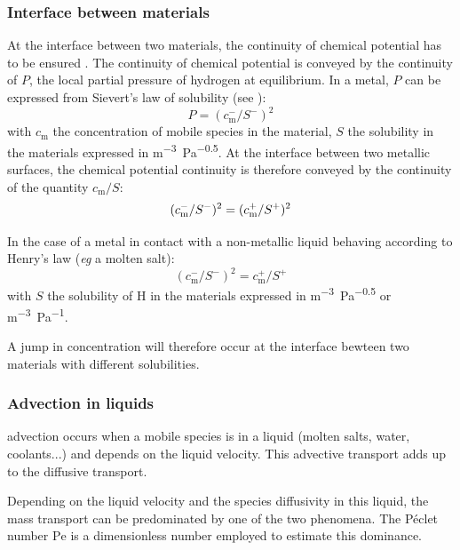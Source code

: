 \subsubsection{Interface between materials}
At the interface between two materials, the continuity of chemical potential has to be ensured .
The continuity of chemical potential is conveyed by the continuity of $P$, the local partial pressure of hydrogen at equilibrium.
In a metal, $P$ can be expressed from Sievert's law of solubility (see ):
\begin{equation}
    P = (c_\mathrm{m}^-/S^-)^2
\end{equation}
with $c_\mathrm{m}$ the concentration of mobile species in the material, $S$ the solubility in the materials expressed in \si{m^{-3}.Pa^{-0.5}}.
At the interface between two metallic surfaces, the chemical potential continuity is therefore conveyed by the continuity of the quantity $c_\mathrm{m}/S$:
\begin{equation}
    (c_\mathrm{m}^-/S^-)^2 = (c_\mathrm{m}^+/S^+)^2
    \labeq{c/s conservation}
\end{equation}

In the case of a metal in contact with a non-metallic liquid behaving according to Henry's law (\textit{eg} a molten salt):
\begin{equation}
    (c_\mathrm{m}^-/S^-)^2 = c_\mathrm{m}^+/S^+
\end{equation}
with $S$ the solubility of \gls{H} in the materials expressed in \si{m^{-3}.Pa^{-0.5}} or \si{m^{-3}.Pa^{-1}}.

A jump in concentration will therefore occur at the interface bewteen two materials with different solubilities.

\subsubsection{Advection in liquids}
\Gls{advection} occurs when a mobile species is in a liquid (molten salts, water, coolants...) and depends on the liquid velocity.
This advective transport adds up to the diffusive transport.

Depending on the liquid velocity and the species diffusivity in this liquid, the mass transport can be predominated by one of the two phenomena.
The Péclet number $\mathrm{Pe}$ is a dimensionless number employed to estimate this dominance.

